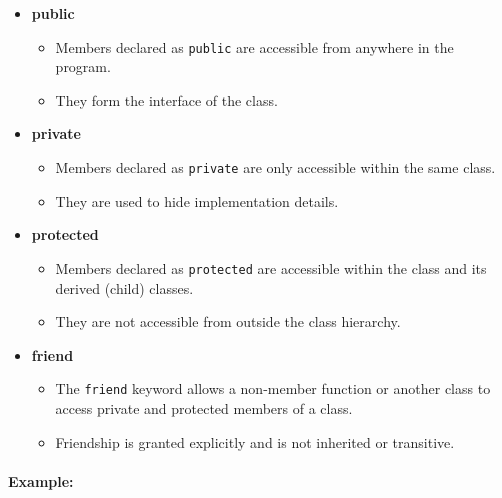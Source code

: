\documentclass[10pt]{article}
\begin{document}
\begin{itemize}
    \item \textbf{public}
    \begin{itemize}
        \item Members declared as \verb|public| are accessible from anywhere in the program.
        \item They form the interface of the class.
    \end{itemize}

    \item \textbf{private}
    \begin{itemize}
        \item Members declared as \verb|private| are only accessible within the same class.
        \item They are used to hide implementation details.
    \end{itemize}

    \item \textbf{protected}
    \begin{itemize}
        \item Members declared as \verb|protected| are accessible within the class and its derived (child) classes.
        \item They are not accessible from outside the class hierarchy.
    \end{itemize}

    \item \textbf{friend}
    \begin{itemize}
        \item The \verb|friend| keyword allows a non-member function or another class to access private and protected members of a class.
        \item Friendship is granted explicitly and is not inherited or transitive.
    \end{itemize}
\end{itemize}

\paragraph{Example:}
\end{document}
